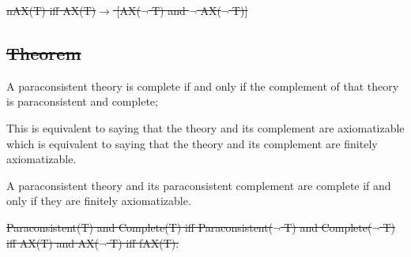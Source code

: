 \st{nAX(T) iff AX(T)$\to$ {[}AX($\neg$ T) and $\neg$ AX($\neg$ T){]}}

\hypertarget{theorem-15}{%
\subsection{\texorpdfstring{\st{Theorem}}{Theorem}}\label{theorem-15}}

A paraconsistent theory is complete if and only if the complement of
that theory is paraconsistent and complete;

This is equivalent to saying that the theory and its complement are
axiomatizable which is equivalent to saying that the theory and its
complement are finitely axiomatizable.

A paraconsistent theory and its paraconsistent complement are complete
if and only if they are finitely axiomatizable.

\st{Paraconsistent(T) and Complete(T) iff Paraconsistent($\neg$ T) and
Complete($\neg$ T) iff AX(T) and AX($\neg$ T) iff fAX(T).}

